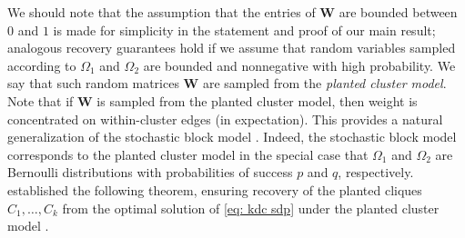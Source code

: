 \documentclass[twoside,11pt]{article}
\newcommand{\bs}{\boldsymbol}
\newcommand{\W}{\bs {W}}
\newcommand{\0}{\bs{0}}
\newcommand{\kdc}{\(k\)-disjoint-clique }
\begin{document}
{We should note that the assumption that the entries of \(\W\) are bounded between \(0\) and
\(1\) is made for simplicity in the statement and proof of our main result;
analogous recovery guarantees hold if we assume that random variables
sampled according to \(\Omega_1\) and \(\Omega_2\)
are bounded and nonnegative with high probability.
We say that such random matrices \(\W\) are sampled from the \emph{planted cluster model}.
Note that if \(\W\) is sampled from the planted cluster model, then weight is concentrated
on within-cluster edges (in expectation).
This provides a natural generalization of the stochastic block model .
Indeed, the stochastic block model corresponds to the planted cluster model
in the special case that \(\Omega_1\) and \(\Omega_2\) are Bernoulli distributions with probabilities of
success \(p\) and \(q\), respectively.
\cite{ames2014guaranteed} established the following theorem, ensuring recovery of the planted cliques
\(C_1, \dots, C_k\) from the optimal solution of \eqref{eq: kdc sdp} under the planted cluster model \citep[see][Theorem 2.1]{ames2014guaranteed}.

}
\end{document}
